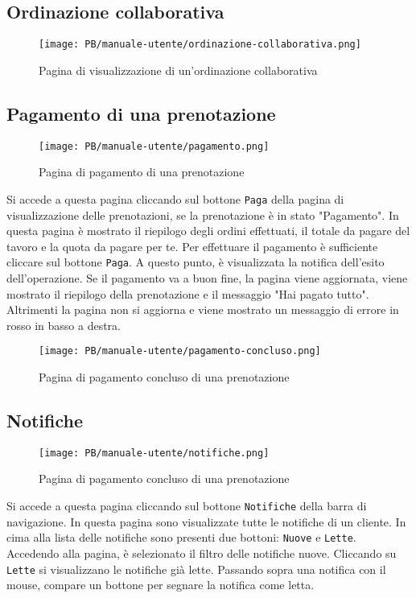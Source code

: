 \subsection{Ordinazione collaborativa}
\begin{figure}[htbp]
    \centering
	\texttt{[image: PB/manuale-utente/ordinazione-collaborativa.png]}
    \caption{Pagina di visualizzazione di un'ordinazione collaborativa}
\end{figure}

\subsection{Pagamento di una prenotazione}
\begin{figure}[htbp]
    \centering
	\texttt{[image: PB/manuale-utente/pagamento.png]}
    \caption{Pagina di pagamento di una prenotazione}
\end{figure}

Si accede a questa pagina cliccando sul bottone \texttt{Paga} della pagina di
visualizzazione delle prenotazioni, se la prenotazione è in stato "Pagamento".
In questa pagina è mostrato il riepilogo degli ordini effettuati, il totale da
pagare del tavoro e la quota da pagare per te. Per effettuare il pagamento è
sufficiente cliccare sul bottone \texttt{Paga}. A questo punto, è visualizzata
la notifica dell'esito dell'operazione. Se il pagamento va a buon fine, la
pagina viene aggiornata, viene mostrato il riepilogo della prenotazione e il
messaggio "Hai pagato tutto". Altrimenti la pagina non si aggiorna e viene
mostrato un messaggio di errore in rosso in basso a destra.

\begin{figure}[htbp]
    \centering
	\texttt{[image: PB/manuale-utente/pagamento-concluso.png]}
    \caption{Pagina di pagamento concluso di una prenotazione}
\end{figure}

\subsection{Notifiche}

\begin{figure}[htbp]
    \centering
	\texttt{[image: PB/manuale-utente/notifiche.png]}
    \caption{Pagina di pagamento concluso di una prenotazione}
\end{figure}

Si accede a questa pagina cliccando sul bottone \texttt{Notifiche} della barra di
navigazione. In questa pagina sono visualizzate tutte le notifiche di un
cliente. In cima alla lista delle notifiche sono presenti due bottoni:
\texttt{Nuove} e \texttt{Lette}. Accedendo alla pagina, è selezionato il filtro
delle notifiche nuove. Cliccando su \texttt{Lette} si visualizzano le notifiche
già lette. Passando sopra una notifica con il mouse, compare un bottone per
segnare la notifica come letta.

